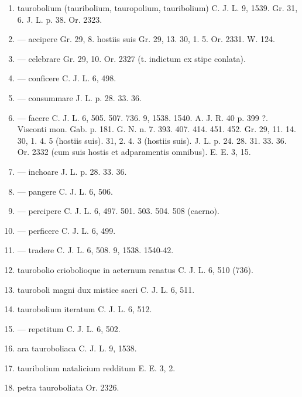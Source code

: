 \documentclass[a4paper, 11pt, oneside, polutonikogreek, german]{article}
\begin{document}
\begin{enumerate}
\item taurobolium (tauribolium, tauropolium, tauribolium) C. J. L. 9, 1539. Gr. 31, 6. J. L. p. 38. Or. 2323.

\item --- accipere Gr. 29, 8. hostiis suis Gr. 29, 13. 30, 1. 5. Or. 2331. W. 124.

\item --- celebrare Gr. 29, 10. Or. 2327 (t. indictum ex stipe conlata).

\item --- conficere C. J. L. 6, 498.

\item --- consummare J. L. p. 28. 33. 36.

\item --- facere C. J. L. 6, 505. 507. 736. 9, 1538. 1540. A. J. R. 40 p. 399 ?. Visconti mon. Gab. p. 181. G. N. n. 7. 393. 407. 414. 451. 452. Gr. 29, 11. 14. 30, 1. 4. 5 (hostiis suis). 31, 2. 4. 3 (hostiis suis). J. L. p. 24. 28. 31. 33. 36. Or. 2332 (cum suis hostis et adparamentis omnibus). E. E. 3, 15.

\item --- inchoare J. L. p. 28. 33. 36.

\item --- pangere C. J. L. 6, 506.

\item --- percipere C. J. L. 6, 497. 501. 503. 504. 508 (caerno).

\item --- perficere C. J. L. 6, 499.

\item --- tradere C. J. L. 6, 508. 9, 1538. 1540-42.

\item taurobolio criobolioque in aeternum renatus C. J. L. 6, 510 (736).

\item tauroboli magni dux mistice sacri C. J. L. 6, 511.

\item taurobolium iteratum C. J. L. 6, 512.

\item --- repetitum C. J. L. 6, 502.

\item ara tauroboliaca C. J. L. 9, 1538.

\item tauribolium natalicium redditum E. E. 3, 2.

\item petra tauroboliata Or. 2326.


\end{enumerate}
\end{document}
